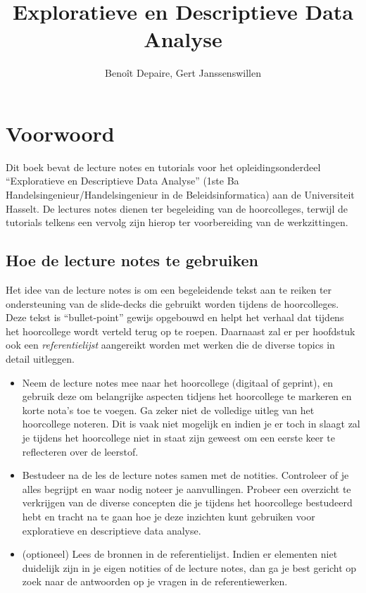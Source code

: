 \documentclass[]{tufte-book}
\title{Exploratieve en Descriptieve Data Analyse}
\author{Benoît Depaire, Gert Janssenswillen}
\date{}
\providecommand{\tightlist}{%
  \setlength{\itemsep}{0pt}\setlength{\parskip}{0pt}}
\begin{document}
\maketitle



{
\setcounter{tocdepth}{1}
\tableofcontents
}

\hypertarget{voorwoord}{%
\chapter*{Voorwoord}\label{voorwoord}}

Dit boek bevat de lecture notes en tutorials voor het opleidingsonderdeel ``Exploratieve en Descriptieve Data Analyse'' (1ste Ba Handelsingenieur/Handelsingenieur in de Beleidsinformatica) aan de Universiteit Hasselt. De lectures notes dienen ter begeleiding van de hoorcolleges, terwijl de tutorials telkens een vervolg zijn hierop ter voorbereiding van de werkzittingen.

\hypertarget{hoe-de-lecture-notes-te-gebruiken}{%
\section*{Hoe de lecture notes te gebruiken}\label{hoe-de-lecture-notes-te-gebruiken}}

Het idee van de lecture notes is om een begeleidende tekst aan te reiken ter ondersteuning van de slide-decks die gebruikt worden tijdens de hoorcolleges. Deze tekst is ``bullet-point'' gewijs opgebouwd en helpt het verhaal dat tijdens het hoorcollege wordt verteld terug op te roepen. Daarnaast zal er per hoofdstuk ook een \emph{referentielijst} aangereikt worden met werken die de diverse topics in detail uitleggen.

\begin{itemize}
\tightlist
\item
  Neem de lecture notes mee naar het hoorcollege (digitaal of geprint), en gebruik deze om belangrijke aspecten tidjens het hoorcollege te markeren en korte nota's toe te voegen. Ga zeker niet de volledige uitleg van het hoorcollege noteren. Dit is vaak niet mogelijk en indien je er toch in slaagt zal je tijdens het hoorcollege niet in staat zijn geweest om een eerste keer te reflecteren over de leerstof.
\item
  Bestudeer na de les de lecture notes samen met de notities. Controleer of je alles begrijpt en waar nodig noteer je aanvullingen. Probeer een overzicht te verkrijgen van de diverse concepten die je tijdens het hoorcollege bestudeerd hebt en tracht na te gaan hoe je deze inzichten kunt gebruiken voor exploratieve en descriptieve data analyse.
\item
  (optioneel) Lees de bronnen in de referentielijst. Indien er elementen niet duidelijk zijn in je eigen notities of de lecture notes, dan ga je best gericht op zoek naar de antwoorden op je vragen in de referentiewerken.
\end{itemize}
\end{document}
